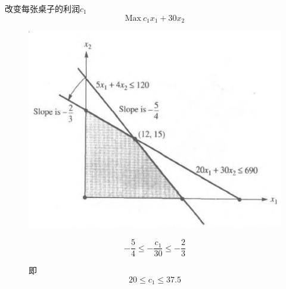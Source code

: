 \documentclass[mathserif, table]{beamer}
\begin{document}
\begin{frame}{改变每张桌子的利润$c_1$}
  \[
  \mbox{Max}\ c_1x_1 + 30x_2
  \]

  \begin{figure}
    \begin{minipage}{.5\linewidth}
      \includegraphics[width=\textwidth{}]{table.png}
    \end{minipage}%
    \begin{minipage}{.5\linewidth}
      \[
      -\frac{5}{4} \le -\frac{c_1}{30} \le -\frac{2}{3}
      \]

      即
      \[
      20 \le c_1 \le 37.5
      \]

    \end{minipage}
  \end{figure}  

\end{frame}
\end{document}
